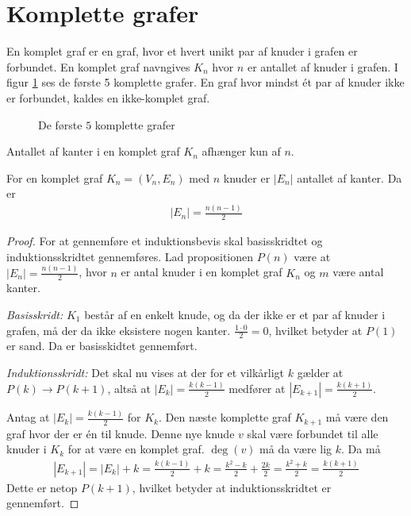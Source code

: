 \section{Komplette grafer}
En komplet graf er en graf, hvor et hvert unikt par af knuder i grafen er forbundet.
En komplet graf navngives $K_n$ hvor $n$ er antallet af knuder i grafen.
I figur \ref{fig:komplette_grafer} ses de første 5 komplette grafer.
En graf hvor mindst ét par af knuder ikke er forbundet, kaldes en ikke-komplet graf.

\begin{figure}[h]
	\centering
	
	\caption{De første $5$ komplette grafer} \label{fig:komplette_grafer}
\end{figure}

Antallet af kanter i en komplet graf $K_n$ afhænger kun af $n$.

\begin{thm}
	For en komplet graf $K_n = (V_n, E_n)$ med $n$ knuder er $|E_n|$ antallet af kanter. Da er
	\begin{align*}
		|E_n| = \frac{n (n - 1)}{2}
	\end{align*}
\end{thm}
\begin{proof}
	For at gennemføre et induktionsbevis skal basisskridtet og induktionsskridtet gennemføres.
	Lad propositionen $P(n)$ være at $|E_n|= \frac{n (n - 1)}{2}$, hvor $n$ er antal knuder i en komplet graf $K_n$ og $m$ være antal kanter.

	\textit{Basisskridt:} $K_1$ består af en enkelt knude, og da der ikke er et par af knuder i grafen, må der da ikke eksistere nogen kanter.
	$\frac{ 1 \cdot 0}{2} = 0$, hvilket betyder at $P(1)$ er sand. Da er basisskidtet gennemført.

	\textit{Induktionsskridt:} Det skal nu vises at der for et vilkårligt $k$ gælder at $P(k) \to P(k + 1)$, altså at $|E_k| = \frac{k (k - 1)}{2}$ medfører at $|E_{k+1}| = \frac{k (k + 1)}{2}$.

	Antag at $|E_k| = \frac{k (k - 1)}{2}$ for $K_k$.
	Den næste komplette graf $K_{k+1}$ må være den graf hvor der er én til knude. Denne nye knude $v$ skal være forbundet til alle knuder i $K_k$ for at være en komplet graf. $\deg (v)$ må da være lig $k$. Da må
	\begin{align*}
		|E_{k+1}| 
		= |E_k| + k
		= \frac{k (k - 1)}{2} + k
		= \frac{k^2 - k}{2} + \frac{2k}{2}
		= \frac{k^2 + k}{2} 
		= \frac{k (k + 1)}{2}
	\end{align*}
	Dette er netop $P(k + 1)$, hvilket betyder at induktionsskridtet er gennemført.
\end{proof}
